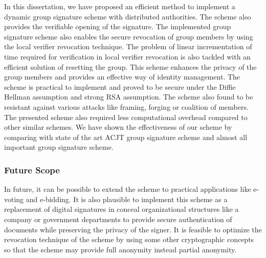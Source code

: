 In this dissertation, we have proposed an efficient method to implement a dynamic group signature scheme with distributed authorities. The scheme also provides the verifiable opening of the signature. The implemented group signature scheme also enables the secure revocation of group members by using the local verifier revocation technique. The problem of linear incrementation of time required for verification in local verifier revocation is also tackled with an efficient solution of resetting the group. This scheme enhances the privacy of the group members and provides an effective way of identity management. The scheme is practical to implement and proved to be secure under the Diffie Hellman assumption and strong RSA assumption. The scheme also found to be resistant against various attacks like framing, forging or coalition of members. The presented scheme also required less computational overhead compared to other similar schemes. We have shown the effectiveness of our scheme by comparing with state of the art ACJT group signature scheme and almost all important group signature scheme.

\subsubsection{Future Scope}
In future, it can be possible to extend the scheme to practical applications like e-voting and e-bidding. It is also plausible to implement this scheme as a replacement of digital signatures in conceal organizational structures like a company or government departments to provide secure authentication of documents while preserving the privacy of the signer. It is feasible to optimize the revocation technique of the scheme by using some other cryptographic concepts so that the scheme may provide full anonymity instead partial anonymity.